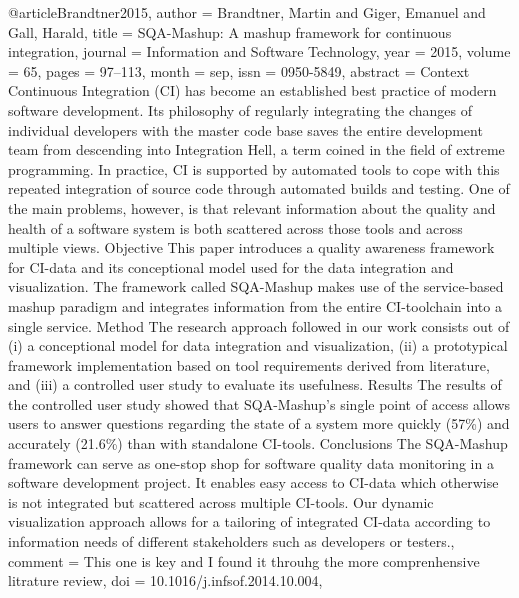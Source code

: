 {@article{Brandtner2015,
  author     = {Brandtner, Martin and Giger, Emanuel and Gall, Harald},
  title      = {{SQA}-{Mashup}: {A} mashup framework for continuous integration},
  journal    = {Information and Software Technology},
  year       = {2015},
  volume     = {65},
  pages      = {97--113},
  month      = sep,
  issn       = {0950-5849},
  abstract   = {Context
Continuous Integration (CI) has become an established best practice of modern software development. Its philosophy of regularly integrating the changes of individual developers with the master code base saves the entire development team from descending into Integration Hell, a term coined in the field of extreme programming. In practice, CI is supported by automated tools to cope with this repeated integration of source code through automated builds and testing. One of the main problems, however, is that relevant information about the quality and health of a software system is both scattered across those tools and across multiple views.
Objective
This paper introduces a quality awareness framework for CI-data and its conceptional model used for the data integration and visualization. The framework called SQA-Mashup makes use of the service-based mashup paradigm and integrates information from the entire CI-toolchain into a single service.
Method
The research approach followed in our work consists out of (i) a conceptional model for data integration and visualization, (ii) a prototypical framework implementation based on tool requirements derived from literature, and (iii) a controlled user study to evaluate its usefulness.
Results
The results of the controlled user study showed that SQA-Mashup’s single point of access allows users to answer questions regarding the state of a system more quickly (57\%) and accurately (21.6\%) than with standalone CI-tools.
Conclusions
The SQA-Mashup framework can serve as one-stop shop for software quality data monitoring in a software development project. It enables easy access to CI-data which otherwise is not integrated but scattered across multiple CI-tools. Our dynamic visualization approach allows for a tailoring of integrated CI-data according to information needs of different stakeholders such as developers or testers.},
  comment    = {This one is key and I found it throuhg the more comprenhensive litrature review},
  doi        = {10.1016/j.infsof.2014.10.004},
}}
